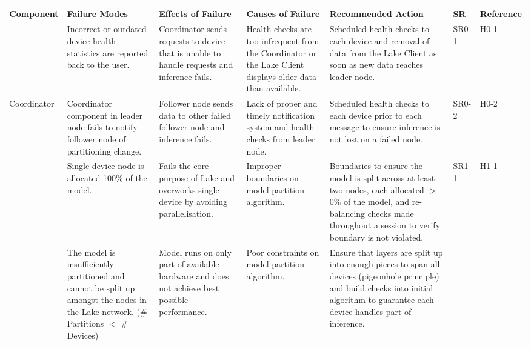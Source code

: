 \documentclass{article}
\begin{document}
\begin{landscape}
\begin{longtable}{|p{}|p{}|p{}|p{}|p{}|p{}|p{}|}
\hline
Component
  & Failure Modes
  & Effects of Failure
  & Causes of Failure
  & Recommended Action
  & SR
  & Reference \\ \hline
\endfirsthead
%
\endhead
%
%
  & Incorrect or outdated device health statistics are reported back to the user.
  & Coordinator sends requests to device that is unable to handle requests and inference fails.
  & Health checks are too infrequent from the Coordinator or the Lake Client displays older data than available.
  & Scheduled health checks to each device and removal of data from the Lake Client as soon as new data reaches leader node.
  & SR0-1
  & H0-1 \\ \cline{2-7}
\multirow{-2}{\dimexpr0.2\textwidth\relax}{Coordinator}
  & Coordinator component in leader node fails to notify follower node of partitioning change.
  & Follower node sends data to other failed follower node and inference fails.
  & Lack of proper and timely notification system and health checks from leader node.
  & Scheduled health checks to each device prior to each message to ensure inference is not lost on a failed node.
  & SR0-2
  & H0-2 \\ \hline
%
%
  & Single device node is allocated 100\% of the model.
  & Fails the core purpose of Lake and overworks single device by avoiding parallelisation.
  & Improper boundaries on model partition algorithm.
  & Boundaries to ensure the model is split across at least two nodes, each allocated $>$0\% of the model, and re-balancing checks made throughout a session to verify boundary is not violated.
  & SR1-1
  & H1-1 \\ \cline{2-7}
  & The model is insufficiently partitioned and cannot be split up amongst the
    nodes in the Lake network. (\# Partitions $<$ \# Devices)
  & Model runs on only part of available hardware and does not achieve best possible performance.
  & Poor constraints on model partition algorithm.
  & Ensure that layers are split up into enough pieces to span all devices
    (pigeonhole principle) and build checks into initial algorithm to guarantee each device handles part of inference.

\end{longtable}
\end{landscape}
\end{document}
